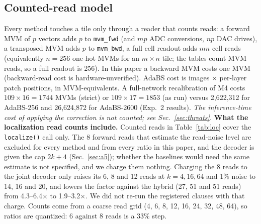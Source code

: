 \documentclass[journal]{IEEEtran}
\newcommand{\mfour}{\textsc{M4}}
\begin{document}
\subsection{Counted-read model}
Every method touches a tile only through a reader that counts reads: a forward MVM of $p$ vectors adds $p$ to \texttt{mvm\_fwd} (and $mp$ ADC conversions, $np$ DAC drives),
a transposed MVM adds $p$ to \texttt{mvm\_bwd}, a full cell readout adds $mn$ cell reads (equivalently $n=256$ one-hot MVMs for an $m\times n$ tile; the tables count MVM reads, so a full readout is 256). In this paper a backward MVM costs one MVM
(backward-read cost is hardware-unverified). AdaBS cost is images $\times$ per-layer patch positions, in MVM-equivalents. A full-network recalibration of \mfour{} costs
$109\times16=1744$ MVMs (strict) or $109\times17=1853$ (as run) %
versus 2,622,312 for AdaBS-256 and 26,624,872 for AdaBS-2600 (Exp.~2 results).
\emph{The inference-time cost of applying the correction is not counted; see Sec.~\ref{sec:threats}.}
\textbf{What the localization read counts include.} Counted reads in Table~\ref{tab:loc} cover the \texttt{localize()} call only. The 8 forward reads that estimate the read-noise level are excluded for every method and from every ratio in this paper, and the decoder is given the cap $2k+4$ (Sec.~\ref{sec:a5}); whether the baselines would need the same estimate is not specified, and we charge them nothing. Charging the 8 reads to the joint decoder only raises its 6, 8 and 12 reads at $k=4,16,64$ and 1\% noise to 14, 16 and 20, and lowers the factor against the hybrid (27, 51 and 51 reads) from 4.3--6.4$\times$ to 1.9--3.2$\times$. We did not re-run the registered clauses with that charge. Counts come from a coarse read grid (4, 6, 8, 12, 16, 24, 32, 48, 64), so ratios are quantized: 6 against 8 reads is a 33\% step.
\end{document}

